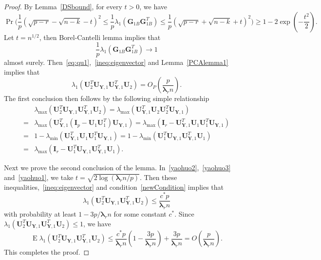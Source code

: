 \documentclass[12pt]{article} %
\DeclareMathOperator{\myE}{E}
\newcommand{\bY}{\mathbf{Y}}
\newcommand{\bG}{\mathbf{G}}
\newcommand{\bI}{\mathbf{I}}
\newcommand{\bU}{\mathbf{U}}
\newcommand{\bfsym}[1]{\ensuremath{\boldsymbol{#1}}}
\def\blambda {\bfsym {\lambda}}
\theoremstyle{definition}
\begin{document}
\begin{proof}
    By Lemma~\ref{DSbound}, for every $t>0$, we have
    \begin{equation}\label{yaohuo1}
    \Pr\Big(\frac{1}{p}(\sqrt{p-r}-\sqrt{n-k}-t)^2 \leq \frac{1}{p}{\lambda_1(\bG_{1B}\bG_{1B}^T)}\leq \frac{1}{p}(\sqrt{p-r}+\sqrt{n-k}+t)^2 \Big) 
   \geq 1-2\exp(-\frac{t^2}{2}).
    \end{equation}
    Let $t=n^{1/2}$, then Borel-Cantelli lemma implies that 
    \begin{equation}\label{eq:qu1}
    \frac{1}{p}\lambda_1(\bG_{1B}\bG_{1B}^T)\to 1
    \end{equation}
    almost surely.
    Then~\eqref{eq:qu1},~\eqref{ineq:eigenvector} and Lemma~\ref{PCAlemma1} implies that
    $$\lambda_{1}(\bU_{2}^T \bU_{\bY,1} \bU_{\bY,1}^T \bU_{2})=O_P(\frac{p}{\blambda_r n}).
    $$
 The first conclusion then follows by the following simple relationship
$$
\begin{aligned}
&\lambda_{\max}(\bU_{2}^T \bU_{\bY,1} \bU_{\bY,1}^T \bU_{2})
=
\lambda_{\max}(\bU_{\bY,1}^T \bU_{2} \bU_{2}^T \bU_{\bY,1})\\
=&
    \lambda_{\max}(\bU_{\bY,1}^T (\bI_p-\bU_{1} \bU_{1}^T) \bU_{\bY,1})
    =
\lambda_{\max}(\bI_r-\bU_{\bY,1}^T\bU_{1} \bU_{1}^T \bU_{\bY,1})\\
=&
1-\lambda_{\min}(\bU_{\bY,1}^T\bU_{1} \bU_{1}^T \bU_{\bY,1})
=
1-\lambda_{\min}( \bU_{1}^T \bU_{\bY,1}\bU_{\bY,1}^T\bU_{1})\\
=&
\lambda_{\max}(\bI_r-\bU_{1}^T \bU_{\bY,1}\bU_{\bY,1}^T\bU_{1}).
\end{aligned}
$$

Next we prove the second conclusion of the lemma.
In~\eqref{yaohuo2},~\eqref{yaohuo3} and~\eqref{yaohuo1}, we take $t=\sqrt{2\log(\blambda_r n/p)}$.
Then these inequalities,~\eqref{ineq:eigenvector} and condition~\eqref{newCondition} implies that
$$
\lambda_{1}(\bU_{2}^T \bU_{\bY,1} \bU_{\bY,1}^T \bU_{2})\leq
\frac{c^*p}{\blambda_r n}
$$
with probability at least $1-3p/\blambda_r n$ for some constant $c^*$.
Since $\lambda_{1}(\bU_{2}^T \bU_{\bY,1} \bU_{\bY,1}^T \bU_{2})\leq 1$, we have
$$
\myE\lambda_{1}(\bU_{2}^T \bU_{\bY,1} \bU_{\bY,1}^T \bU_{2})\leq
\frac{c^* p}{\blambda_r n}(1-\frac{3p}{\blambda_r n})
+\frac{3p}{\blambda_r n}=O(\frac{p}{\blambda_r n}).
$$
This completes the proof.
\end{proof}
\end{document}
